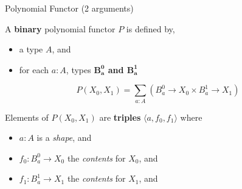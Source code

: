 \documentclass[t,12pt]{beamer}
\begin{document}

\begin{frame}{Polynomial Functor (2 arguments)}

    \vfill

    A \textbf{binary} polynomial functor $P$ is defined by,
    \begin{itemize}
        \item a type $A$, and
        \item for each $a : A$, types \textbf{$\mathbf{B^0_{a}}$ and $\mathbf{B^1_a}$}
    \end{itemize}

    \vfill

    \[
        P(X_0, X_1) = \sum_{a : A} \left( B^0_a → X_0  ×  B^1_a → X_1 \right)
    \]

    \vfill

    Elements of $P(X_0, X_1)$ are \textbf{triples} $⟨a, f_0, f_1⟩$ where
    \begin{itemize}
        \item $a : A$ is a \emph{shape}, and
        \item $f_0 : B^0_a → X_0$ the \emph{contents} for $X_0$, and
        \item $f_1 : B^1_a → X_1$ the \emph{contents} for $X_1$, and
    \end{itemize}


    \vfill
    
\end{frame}

\end{document}

